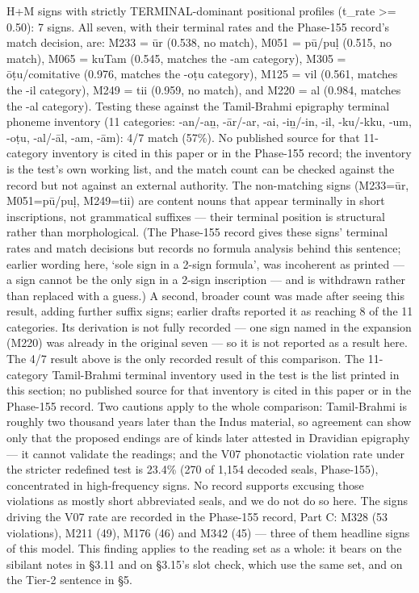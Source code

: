 \documentclass[
]{article}
\begin{document}
H+M signs with strictly TERMINAL-dominant positional profiles (t\_rate \textgreater{}= 0.50): 7 signs. All seven, with their terminal rates and the Phase-155 record's match decision, are: M233 = ūr (0.538, no match), M051 = pū/puḷ (0.515, no match), M065 = kuTam (0.545, matches the -am category), M305 = ōṭu/comitative (0.976, matches the -oṭu category), M125 = vil (0.561, matches the -il category), M249 = tii (0.959, no match), and M220 = al (0.984, matches the -al category). Testing these against the Tamil-Brahmi epigraphy terminal phoneme inventory (11 categories: -an/-aṉ, -ār/-ar, -ai, -iṉ/-in, -il, -ku/-kku, -um, -oṭu, -al/-āl, -am, -ām): 4/7 match (57\%). No published source for that 11-category inventory is cited in this paper or in the Phase-155 record; the inventory is the test's own working list, and the match count can be checked against the record but not against an external authority. The non-matching signs (M233=ūr, M051=pū/puḷ, M249=tii) are content
nouns that appear terminally in short inscriptions, not grammatical
suffixes --- their terminal position is structural rather than morphological. (The Phase-155 record gives these signs' terminal rates and match decisions but records no formula analysis behind this sentence; earlier wording here, `sole sign in a 2-sign formula', was incoherent as printed --- a sign cannot be the only sign in a 2-sign inscription --- and is withdrawn rather than replaced with a guess.) A second, broader count was made after seeing this result, adding further suffix signs; earlier drafts reported it as reaching 8 of the 11 categories. Its derivation is not fully recorded --- one sign named in the expansion (M220) was already in the original seven --- so it is not reported as a result here. The 4/7 result above is the only recorded result of this comparison. The 11-category Tamil-Brahmi terminal inventory used in the test is the list printed in this section; no published source for that inventory is cited in this paper or in the Phase-155 record. Two cautions apply to the whole comparison: Tamil-Brahmi is roughly two thousand years later than the Indus material, so agreement can show only that the proposed endings are of kinds later attested in Dravidian epigraphy --- it cannot validate the readings; and the V07 phonotactic violation rate under the stricter redefined test is 23.4\% (270 of 1,154 decoded seals, Phase-155), concentrated in high-frequency signs. No record supports excusing those violations as mostly short abbreviated seals, and we do not do so here. The signs driving the V07 rate are recorded in the Phase-155 record, Part C: M328 (53 violations), M211 (49), M176 (46) and M342 (45) --- three of them headline signs of this model. This finding applies to the reading set as a whole: it bears on the sibilant notes in §3.11 and on §3.15's slot check, which use the same set, and on the Tier-2 sentence in §5.
\end{document}

